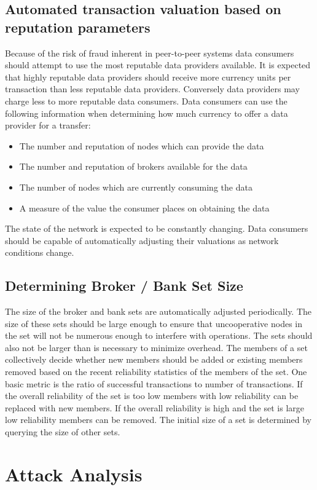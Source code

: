 \documentclass[%
				10pt,
        final,
        notitlepage,
        narroweqnarray,
        inline,
        twoside,
        ]{ieee}
\begin{document}
\subsection{Automated transaction valuation based on reputation parameters}
Because of the risk of fraud inherent in peer-to-peer systems data consumers should attempt to use the most reputable data providers available.  It is expected that highly reputable data providers should receive more currency units per transaction than less reputable data providers.  Conversely data providers may charge less to more reputable data consumers.  
Data consumers can use the following information when determining how much currency to offer a data provider for a transfer:
\begin{itemize}
\item The number and reputation of nodes which can provide the data
\item The number and reputation of brokers available for the data
\item The number of nodes which are currently consuming the data
\item A measure of the value the consumer places on obtaining the data
\end{itemize}
The state of the network is expected to be constantly changing.  Data consumers should be capable of automatically adjusting their valuations as network conditions change. 

\subsection{Determining Broker / Bank Set Size}
The size of the broker and bank sets are automatically adjusted periodically.  The size of these sets should be large enough to ensure that uncooperative nodes in the set will not be numerous enough to interfere with operations.  The sets should also not be larger than is necessary to minimize overhead.  The members of a set collectively decide whether new members should be added or existing members removed based on the recent reliability statistics of the members of the set.  One basic metric is the ratio of successful transactions to number of transactions.  If the overall reliability of the set is too low members with low reliability can be replaced with new members.  If the overall reliability is high and the set is large low reliability members can be removed.  The initial size of a set is determined by querying the size of other sets.

\section{Attack Analysis}
\end{document}
